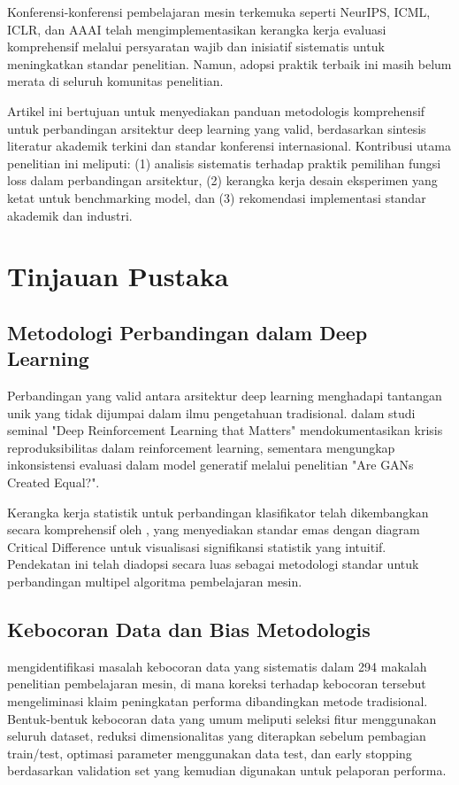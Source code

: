 \documentclass[12pt,a4paper]{article}
\begin{document}
Konferensi-konferensi pembelajaran mesin terkemuka seperti NeurIPS, ICML, ICLR, dan AAAI telah mengimplementasikan kerangka kerja evaluasi komprehensif melalui persyaratan wajib dan inisiatif sistematis untuk meningkatkan standar penelitian. Namun, adopsi praktik terbaik ini masih belum merata di seluruh komunitas penelitian.

Artikel ini bertujuan untuk menyediakan panduan metodologis komprehensif untuk perbandingan arsitektur deep learning yang valid, berdasarkan sintesis literatur akademik terkini dan standar konferensi internasional. Kontribusi utama penelitian ini meliputi: (1) analisis sistematis terhadap praktik pemilihan fungsi loss dalam perbandingan arsitektur, (2) kerangka kerja desain eksperimen yang ketat untuk benchmarking model, dan (3) rekomendasi implementasi standar akademik dan industri.

\section{Tinjauan Pustaka}

\subsection{Metodologi Perbandingan dalam Deep Learning}

Perbandingan yang valid antara arsitektur deep learning menghadapi tantangan unik yang tidak dijumpai dalam ilmu pengetahuan tradisional. \citet{henderson2018deep} dalam studi seminal "Deep Reinforcement Learning that Matters" mendokumentasikan krisis reproduksibilitas dalam reinforcement learning, sementara \citet{lucic2018gans} mengungkap inkonsistensi evaluasi dalam model generatif melalui penelitian "Are GANs Created Equal?".

Kerangka kerja statistik untuk perbandingan klasifikator telah dikembangkan secara komprehensif oleh \citet{demsar2006statistical}, yang menyediakan standar emas dengan diagram Critical Difference untuk visualisasi signifikansi statistik yang intuitif. Pendekatan ini telah diadopsi secara luas sebagai metodologi standar untuk perbandingan multipel algoritma pembelajaran mesin.

\subsection{Kebocoran Data dan Bias Metodologis}

\citet{kapoor2022leakage} mengidentifikasi masalah kebocoran data yang sistematis dalam 294 makalah penelitian pembelajaran mesin, di mana koreksi terhadap kebocoran tersebut mengeliminasi klaim peningkatan performa dibandingkan metode tradisional. Bentuk-bentuk kebocoran data yang umum meliputi seleksi fitur menggunakan seluruh dataset, reduksi dimensionalitas yang diterapkan sebelum pembagian train/test, optimasi parameter menggunakan data test, dan early stopping berdasarkan validation set yang kemudian digunakan untuk pelaporan performa.
\end{document}
